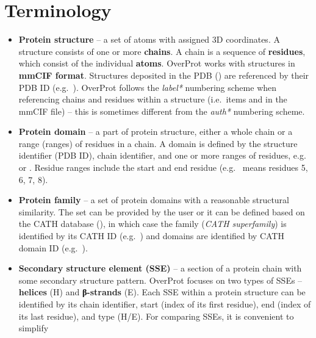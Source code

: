 \documentclass{article}
\begin{document}
\section{Terminology}

\begin{itemize}
  \item
    \textbf{Protein structure} -- a set of atoms with assigned 3D
    coordinates. A structure consists of one or more \textbf{chains}. A
    chain is a sequence of \textbf{residues}, which consist of the
    individual \textbf{atoms}. OverProt works with structures in
    \textbf{mmCIF format}. Structures deposited in the PDB 
    ()
    are referenced by their PDB ID (e.g.~). OverProt follows the
    \emph{label*} numbering scheme when referencing chains and residues
    within a structure (i.e.~items  and
     in the mmCIF file) -- this is sometimes
    different from the \emph{auth*} numbering scheme.
  \item
    \textbf{Protein domain} -- a part of protein structure, either a
    whole chain or a range (ranges) of residues in a chain. A domain is
    defined by the structure identifier (PDB ID), chain identifier, and one or more
    ranges of residues, e.g.~ or
    . Residue ranges include the start and end
    residue (e.g.~ means residues 5, 6, 7, 8).
  \item
    \textbf{Protein family} -- a set of protein domains with a reasonable
    structural similarity. The set can be provided by the user or it can
    be defined based on the CATH database (), 
    in which case the family (\emph{CATH superfamily}) is identified by its CATH ID
    (e.g.~) and domains are identified by CATH domain
    ID (e.g.~).
  \item
    \textbf{Secondary structure element (SSE)} -- a section of a protein
    chain with some secondary structure pattern. OverProt focuses on two
    types of SSEs -- \textbf{helices} (H) and \textbf{β-strands} (E). Each
    SSE within a protein structure can be identified by its chain
    identifier, start (index of its first residue), end (index of its last
    residue), and type (H/E). For comparing SSEs, it is convenient to simplify

\end{itemize}
\end{document}
